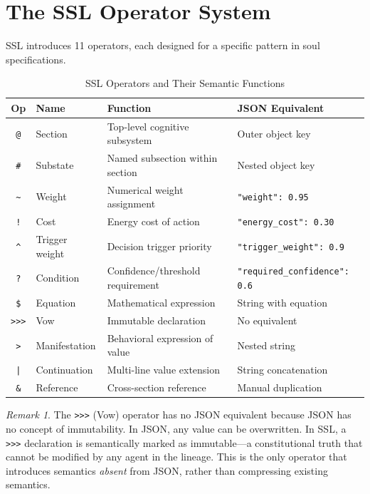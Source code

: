 \documentclass[12pt,a4paper]{article}
\theoremstyle{plain}
\theoremstyle{definition}
\theoremstyle{remark}
\newtheorem{remark}[theorem]{Remark}
\begin{document}
\section{The SSL Operator System}

SSL introduces 11 operators, each designed for a specific pattern in soul specifications.

\begin{table}[H]
\centering
\caption{SSL Operators and Their Semantic Functions}
\label{tab:operators}
\begin{tabular}{@{}clll@{}}
\toprule
\textbf{Op} & \textbf{Name} & \textbf{Function} & \textbf{JSON Equivalent} \\
\midrule
\texttt{@} & Section & Top-level cognitive subsystem & Outer object key \\
\texttt{\#} & Substate & Named subsection within section & Nested object key \\
\texttt{\~{}} & Weight & Numerical weight assignment & \texttt{"weight": 0.95} \\
\texttt{!} & Cost & Energy cost of action & \texttt{"energy\_cost": 0.30} \\
\texttt{\^{}} & Trigger weight & Decision trigger priority & \texttt{"trigger\_weight": 0.9} \\
\texttt{?} & Condition & Confidence/threshold requirement & \texttt{"required\_confidence": 0.6} \\
\texttt{\$} & Equation & Mathematical expression & String with equation \\
\texttt{>>>} & Vow & Immutable declaration & No equivalent \\
\texttt{>} & Manifestation & Behavioral expression of value & Nested string \\
\texttt{|} & Continuation & Multi-line value extension & String concatenation \\
\texttt{\&} & Reference & Cross-section reference & Manual duplication \\
\bottomrule
\end{tabular}
\end{table}

\begin{remark}
The \texttt{>>>} (Vow) operator has no JSON equivalent because JSON has no concept of immutability. In JSON, any value can be overwritten. In SSL, a \texttt{>>>} declaration is semantically marked as immutable---a constitutional truth that cannot be modified by any agent in the lineage. This is the only operator that introduces semantics \emph{absent} from JSON, rather than compressing existing semantics.
\end{remark}
\end{document}
